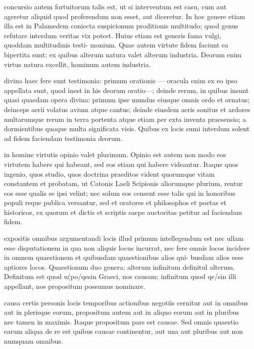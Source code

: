  concursio autem fortuitorum talis est, ut si interventum est casu, cum aut ageretur aliquid quod proferendum non esset, aut diceretur. In hoc genere etiam illa est in Palamedem coniecta suspicionum proditionis multitudo; quod genus refutare interdum veritas vix potest. Huius etiam est generis fama vulgi, quoddam multitudinis testi- monium. Quae autem virtute fidem faciunt ea bipertita sunt; ex quibus alterum natura valet alterum industria. Deorum enim virtus natura excellit, hominum autem industria.

 divina haec fere sunt testimonia: primum orationis — oracula enim ex eo ipso appellata sunt, quod inest in his deorum oratio—; deinde rerum, in quibus insunt quasi quaedam opera divina: primum ipse mundus eiusque omnis ordo et ornatus; deinceps aerii volatus avium atque cantus; deinde eiusdem aeris sonitus et ardores multarumque rerum in terra portenta atque etiam per exta inventa praesensio; a dormientibus quoque multa significata visis. Quibus ex locis sumi interdum solent ad fidem faciendam testimonia deorum.

 in homine virtutis opinio valet plurimum. Opinio est autem non modo eos virtutem habere qui habeant, sed eos etiam qui habere videantur. Itaque quos ingenio, quos studio, quos doctrina praeditos vident quorumque vitam constantem et probatam, ut Catonis Laeli Scipionis aliorumque plurium, rentur eos esse qualis se ipsi velint; nec solum eos censent esse talis qui in honoribus populi reque publica versantur, sed et oratores et philosophos et poetas et historicos, ex quorum et dictis et scriptis saepe auctoritas petitur ad faciendam fidem.

 expositis omnibus argumentandi locis illud primum intellegendum est nec ullam esse disputationem in qua non aliquis locus incurrat, nec fere omnis locos incidere in omnem quaestionem et quibusdam quaestionibus alios qui- busdam alios esse aptiores locos. Quaestionum duo genera: alterum infinitum definitul alterum. Definitum est quod u(po/qesin Graeci, nos causam; infinitum quod qe/sin illi appellant, nos propositum possumus nominare.

 causa certis personis locis temporibus actionibus negotiis cernitur aut in omnibus aut in plerisque eorum, propositum autem aut in aliquo eorum aut in pluribus nec tamen in maximis. Itaque propositum pars est causae. Sed omnis quaestio earum aliqua de re est quibus causae continentur, aut una aut pluribus aut non numquam omnibus.

